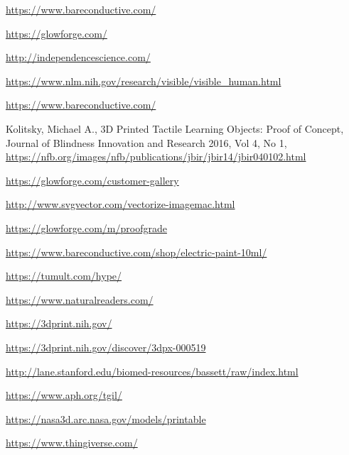 \documentclass[11.5pt]{sig-alternate} %
\begin{document}
\url{https://www.bareconductive.com/}

\url{https://glowforge.com/}

\url{http://independencescience.com/}

\url{https://www.nlm.nih.gov/research/visible/visible\_human.html}

\url{https://www.bareconductive.com/}

Kolitsky, Michael A., 3D Printed Tactile Learning Objects: Proof of Concept, Journal of Blindness Innovation and Research 2016, Vol 4, No 1, \url{https://nfb.org/images/nfb/publications/jbir/jbir14/jbir040102.html}

\url{https://glowforge.com/customer-gallery}

\url{http://www.svgvector.com/vectorize-imagemac.html}

\url{https://glowforge.com/m/proofgrade}

\url{https://www.bareconductive.com/shop/electric-paint-10ml/}

\url{https://tumult.com/hype/}

\url{https://www.naturalreaders.com/}

\url{https://3dprint.nih.gov/}

\url{https://3dprint.nih.gov/discover/3dpx-000519}

\url{http://lane.stanford.edu/biomed-resources/bassett/raw/index.html}

\url{https://www.aph.org/tgil/}

\url{https://nasa3d.arc.nasa.gov/models/printable}

\url{https://www.thingiverse.com/}
\end{document}
